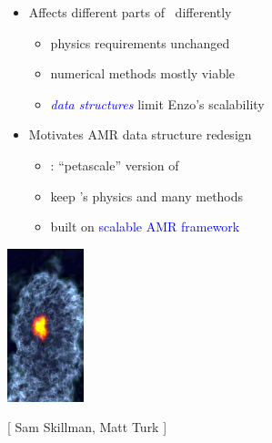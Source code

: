 \begin{frame}[fragile]
\begin{minipage}{3in}
\begin{itemize}
\pause
   \item Affects different parts of \enzo\ differently
     \begin{itemize}
   \item[\smiley] \textcolor{red!80!black}{physics} requirements unchanged
   \item[\smiley] \textcolor{green!50!black}{numerical methods} mostly viable
   \item[\frownie] \textcolor{blue}{\textit{data structures}} limit Enzo's scalability
     \end{itemize}
\pause
   \item Motivates AMR data structure redesign
   \begin{itemize}
   \footnotesize
   \item  \textbf{\enzop}: ``petascale'' version of \enzo
   \item keep \enzo's \textcolor{red!80!black}{physics} and many \textcolor{green!50!black}{methods}
   \item  built on \textbf{\cello} \textcolor{blue}{scalable AMR framework}
   \end{itemize}
  \end{itemize}
\end{minipage}
\begin{minipage}{1in}
   \footnotesize
    \centerline{\includegraphics[width=0.875in]{PopIII_vr-edit.png}}
    \centerline{\tiny {[ Sam Skillman, Matt Turk ]}}
\end{minipage}
\end{frame}
